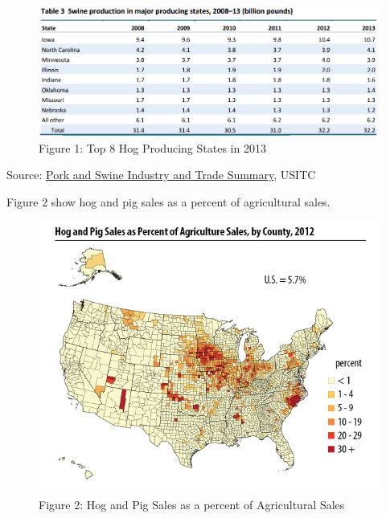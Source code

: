 \documentclass[
  letterpaper,
  DIV=11,
  numbers=noendperiod]{scrreprt}
\begin{document}
\begin{figure}

{\centering \includegraphics{images/hogstates.png}

}

\caption{Figure 1: Top 8 Hog Producing States in 2013}

\end{figure}

Source: \href{pdf-Readings/pork_and_swine_summary.pdf}{Pork and Swine
Industry and Trade Summary}, USITC

Figure 2 show hog and pig sales as a percent of agricultural sales.

\begin{figure}

{\centering \includegraphics{images/hogprodvaluecounty.png}

}

\caption{Figure 2: Hog and Pig Sales as a percent of Agricultural Sales}

\end{figure}
\end{document}
